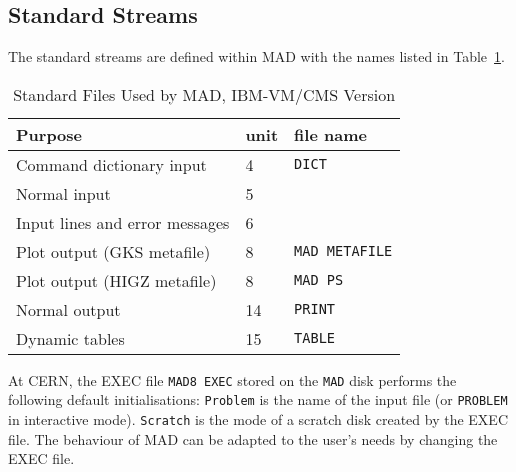 \subsection{Standard Streams}
The standard streams are defined within MAD with the names listed in
Table~\ref{T-IBM}.
\begin{table}[ht]
\caption{Standard Files Used by MAD, IBM-VM/CMS Version}
\vspace{1ex}
\label{T-IBM}
\centering
\begin{tabular}{|l|l|l|}
\hline
Purpose                         &unit  &file name \\
\hline
Command dictionary input        & 4    &{\tt DICT} \\
Normal input                    & 5    & \\
Input lines and error messages  & 6    & \\
Plot output (GKS metafile)      & 8    &{\tt MAD METAFILE} \\
Plot output (HIGZ metafile)     & 8    &{\tt MAD PS} \\
Normal output                   &14    &{\tt PRINT} \\
Dynamic tables                  &15    &{\tt TABLE} \\
\hline
\end{tabular}
\end{table}
At CERN, the EXEC file {\tt MAD8 EXEC} stored on the {\tt MAD} disk
performs the following default initialisations:
{\tt Problem} is the name of the input file
(or {\tt PROBLEM} in interactive mode).
{\tt Scratch} is the mode of a scratch disk created by the EXEC file.
The behaviour of MAD can be adapted to the user's needs
by changing the EXEC file.
 
